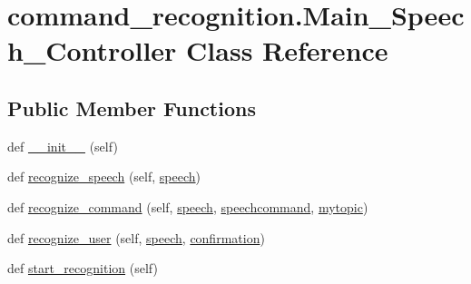 \hypertarget{classcommand__recognition_1_1_main___speech___controller}{}\section{command\+\_\+recognition.\+Main\+\_\+\+Speech\+\_\+\+Controller Class Reference}
\label{classcommand__recognition_1_1_main___speech___controller}
\subsection*{Public Member Functions}
\begin{DoxyCompactItemize}
\item 
def \hyperlink{classcommand__recognition_1_1_main___speech___controller_abfc55f738b24720625190c078d5de151}{\+\_\+\+\_\+init\+\_\+\+\_\+} (self)
\item 
def \hyperlink{classcommand__recognition_1_1_main___speech___controller_a5d05c0bcca81f6fdcea9de648f114291}{recognize\+\_\+speech} (self, \hyperlink{classcommand__recognition_1_1_main___speech___controller_abbf94dd60a0a5244906d8842734eca55}{speech})
\item 
def \hyperlink{classcommand__recognition_1_1_main___speech___controller_a8430ad5000f73886dbc9cde072f0d4ba}{recognize\+\_\+command} (self, \hyperlink{classcommand__recognition_1_1_main___speech___controller_abbf94dd60a0a5244906d8842734eca55}{speech}, \hyperlink{classcommand__recognition_1_1_main___speech___controller_a382d3bbe539ba93713ad9b4057e2a226}{speechcommand}, \hyperlink{classcommand__recognition_1_1_main___speech___controller_ace8e299f41b4b37fe5e3e060fa03781f}{mytopic})
\item 
def \hyperlink{classcommand__recognition_1_1_main___speech___controller_a7b0164a1ceb1c3de76242c77c3b762d5}{recognize\+\_\+user} (self, \hyperlink{classcommand__recognition_1_1_main___speech___controller_abbf94dd60a0a5244906d8842734eca55}{speech}, \hyperlink{classcommand__recognition_1_1_main___speech___controller_a8db8cf2f5d84e14336e83ce65fc79584}{confirmation})
\item 
def \hyperlink{classcommand__recognition_1_1_main___speech___controller_a502341d8112e260fc5912eba6620d788}{start\+\_\+recognition} (self)
\end{DoxyCompactItemize}
